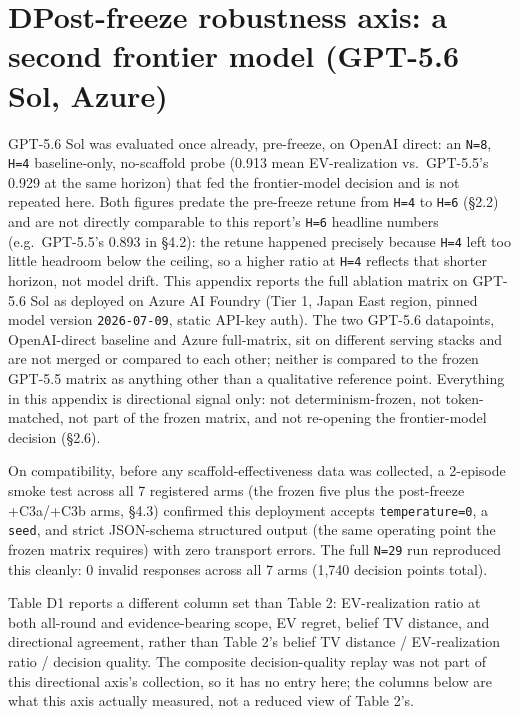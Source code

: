 \documentclass[
  10pt,
]{article}
\begin{document}
\section{D\quad Post-freeze robustness axis: a second frontier model (GPT-5.6 Sol, Azure)}\label{d-post-freeze-robustness-axis-a-second-frontier-model-gpt-5.6-sol-azure}

GPT-5.6 Sol was evaluated once already, pre-freeze, on OpenAI direct: an \texttt{N=8}, \texttt{H=4} baseline-only, no-scaffold probe (0.913 mean EV-realization vs.~GPT-5.5's 0.929 at the same horizon) that fed the frontier-model decision and is not repeated here. Both figures predate the pre-freeze retune from \texttt{H=4} to \texttt{H=6} (§2.2) and are not directly comparable to this report's \texttt{H=6} headline numbers (e.g.~GPT-5.5's 0.893 in §4.2): the retune happened precisely because \texttt{H=4} left too little headroom below the ceiling, so a higher ratio at \texttt{H=4} reflects that shorter horizon, not model drift. This appendix reports the full ablation matrix on GPT-5.6 Sol as deployed on Azure AI Foundry (Tier 1, Japan East region, pinned model version \texttt{2026-07-09}, static API-key auth). The two GPT-5.6 datapoints, OpenAI-direct baseline and Azure full-matrix, sit on different serving stacks and are not merged or compared to each other; neither is compared to the frozen GPT-5.5 matrix as anything other than a qualitative reference point. Everything in this appendix is directional signal only: not determinism-frozen, not token-matched, not part of the frozen matrix, and not re-opening the frontier-model decision (§2.6).

On compatibility, before any scaffold-effectiveness data was collected, a 2-episode smoke test across all 7 registered arms (the frozen five plus the post-freeze +C3a/+C3b arms, §4.3) confirmed this deployment accepts \texttt{temperature=0}, a \texttt{seed}, and strict JSON-schema structured output (the same operating point the frozen matrix requires) with zero transport errors. The full \texttt{N=29} run reproduced this cleanly: 0 invalid responses across all 7 arms (1,740 decision points total).

Table D1 reports a different column set than Table 2: EV-realization ratio at both all-round and evidence-bearing scope, EV regret, belief TV distance, and directional agreement, rather than Table 2's belief TV distance / EV-realization ratio / decision quality. The composite decision-quality replay was not part of this directional axis's collection, so it has no entry here; the columns below are what this axis actually measured, not a reduced view of Table 2's.
\end{document}
